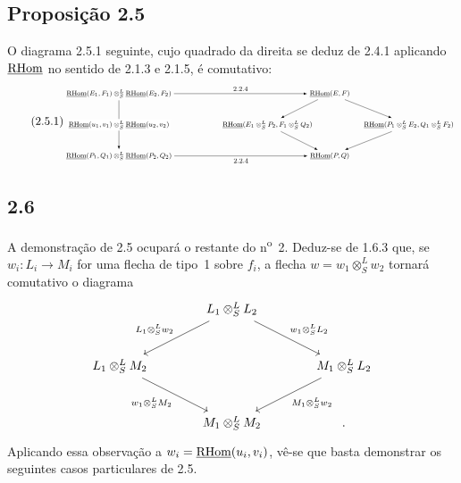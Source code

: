 \subsection*{Proposição 2.5}
O diagrama 2.5.1 seguinte, cujo quadrado da direita se deduz de 2.4.1 aplicando $\underline{\mathrm{RHom}}$ no sentido de 2.1.3 e 2.1.5, é comutativo:
\begin{equation}\tag{2.5.1}
\resizebox{0.98\textwidth}{!}{%
\begin{tikzpicture}[>=latex,baseline=(current bounding box.center)]
\footnotesize
\node (A) at (0,2.6) {$\uRHom(E_1,F_1)\otimes^L_S\uRHom(E_2,F_2)$};
\node (C) at (0,0) {$\uRHom(P_1,Q_1)\otimes^L_S\uRHom(P_2,Q_2)$};
\node (D) at (8.8,2.6) {$\uRHom(E,F)$};
\node (E) at (6.2,1.3) {$\uRHom(E_1\otimes^L_SP_2,F_1\otimes^L_SQ_2)$};
\node (F) at (12.1,1.3) {$\uRHom(P_1\otimes^L_SE_2,Q_1\otimes^L_SF_2)$};
\node (G) at (8.8,0) {$\uRHom(P,Q)$};
\draw[->] (A) -- node[above] {$2.2.4$} (D);
\draw[->] (A) -- node[midway,fill=white,inner sep=2pt] {$\uRHom(u_1,v_1)\otimes^L_S\uRHom(u_2,v_2)$} (C);
\draw[->] (C) -- node[below] {$2.2.4$} (G);
\draw[->] (D) -- (E);
\draw[->] (D) -- (F);
\draw[->] (E) -- (G);
\draw[->] (F) -- (G);
\end{tikzpicture}}
\end{equation}

\subsection*{2.6}
A demonstração de 2.5 ocupará o restante do n\textsuperscript{o}~2. Deduz-se de 1.6.3 que, se $w_i:L_i\to M_i$ for uma flecha de tipo~1 sobre $f_i$, a flecha $w=w_1\otimes^{L}_{S}w_2$ tornará comutativo o diagrama
\[
\begin{tikzcd}[column sep=large,row sep=large]
& L_1\otimes^L_S L_2 \arrow[dl,"{L_1\otimes^L_S w_2}"'] \arrow[dr,"{w_1\otimes^L_S L_2}"] & \\
L_1\otimes^L_S M_2 \arrow[dr,"{w_1\otimes^L_S M_2}"'] & & M_1\otimes^L_S L_2 \arrow[dl,"{M_1\otimes^L_S w_2}"]\\
& M_1\otimes^L_S M_2 & .
\end{tikzcd}
\]
Aplicando essa observação a $w_i=\underline{\mathrm{RHom}}(u_i,v_i)$, vê-se que basta demonstrar os seguintes casos particulares de 2.5.

